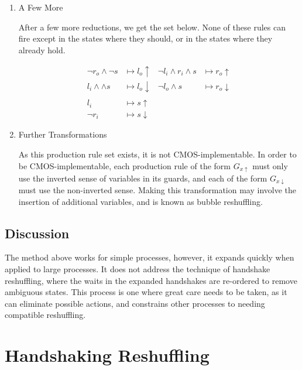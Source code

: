 \documentclass[times,10pt]{article}
\begin{document}
\begin{enumerate}
\item A Few More

After a few more reductions, we get the set below.  None of these rules can fire except in the states where they should, or in the states where they already hold.




\begin{align*}
\lnot r_o \wedge \lnot s & \mapsto l_o \uparrow & \lnot l_i \wedge r_i \wedge s  & \mapsto r_o \uparrow \\
l_i \wedge \wedge s & \mapsto l_o \downarrow  & \lnot l_o \wedge s & \mapsto r_o\downarrow \\ \\
l_i & \mapsto s\uparrow & & \\
\lnot r_i & \mapsto s\downarrow & & 
\end{align*}


\item Further Transformations

As this production rule set exists, it is not CMOS-implementable.  In order to be CMOS-implementable, each production rule of the form $G_{x\uparrow}$ must only use the inverted sense of variables in its guards, and each of the form $G_{x\downarrow}$ must use the non-inverted sense.  Making this transformation may involve the insertion of additional variables, and is known as bubble reshuffling. 

\end{enumerate}

\subsection{Discussion}

The method above works for simple processes, however, it expands quickly when applied to large processes.  It does not address the technique of handshake reshuffling, where the waits in the expanded handshakes are re-ordered to remove ambiguous states.  This process is one where great care needs to be taken, as it can eliminate possible actions, and constrains other processes to needing compatible reshuffling.

\section{Handshaking Reshuffling}
\end{document}
